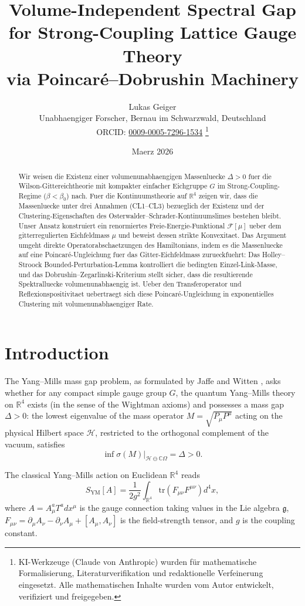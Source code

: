 \documentclass[12pt,a4paper]{article}
\title{\textbf{Volume-Independent Spectral Gap for Strong-Coupling Lattice Gauge Theory\\ via Poincar\'e--Dobrushin Machinery}}
\author{Lukas Geiger\\
\small Unabhaengiger Forscher, Bernau im Schwarzwald, Deutschland\\
\small ORCID: \href{https://orcid.org/0009-0005-7296-1534}{0009-0005-7296-1534}%
\thanks{KI-Werkzeuge (Claude von Anthropic) wurden für mathematische Formalisierung, Literaturverifikation und redaktionelle Verfeinerung eingesetzt. Alle mathematischen Inhalte wurden vom Autor entwickelt, verifiziert und freigegeben.}}
\date{Maerz 2026}
\theoremstyle{definition}
\theoremstyle{plain}
\theoremstyle{remark}
\begin{document}
\maketitle

\begin{abstract}
Wir weisen die Existenz einer volumenunabhaengigen Massenluecke $\Delta > 0$ fuer die Wilson-Gittereichtheorie mit kompakter einfacher Eichgruppe $G$ im Strong-Coupling-Regime ($\beta < \beta_0$) nach. Fuer die Kontinuumstheorie auf $\mathbb{R}^4$ zeigen wir, dass die Massenluecke unter drei Annahmen (CL1--CL3) bezueglich der Existenz und der Clustering-Eigenschaften des Osterwalder--Schrader-Kontinuumslimes bestehen bleibt. Unser Ansatz konstruiert ein renormiertes Freie-Energie-Funktional $\mathcal{F}[\mu]$ ueber dem gitterregulierten Eichfeldmass $\mu$ und beweist dessen strikte Konvexitaet. Das Argument umgeht direkte Operatorabschaetzungen des Hamiltonians, indem es die Massenluecke auf eine Poincar\'e-Ungleichung fuer das Gitter-Eichfeldmass zurueckfuehrt: Das Holley--Stroock Bounded-Perturbation-Lemma kontrolliert die bedingten Einzel-Link-Masse, und das Dobrushin--Zegarlinski-Kriterium stellt sicher, dass die resultierende Spektralluecke volumenunabhaengig ist. Ueber den Transferoperator und Reflexionspositivitaet uebertraegt sich diese Poincar\'e-Ungleichung in exponentielles Clustering mit volumenunabhaengiger Rate.
\end{abstract}

\section{Introduction}

The Yang--Mills mass gap problem, as formulated by Jaffe and Witten \cite{JaffeWitten2000}, asks whether for any compact simple gauge group $G$, the quantum Yang--Mills theory on $\mathbb{R}^4$ exists (in the sense of the Wightman axioms) and possesses a mass gap $\Delta > 0$: the lowest eigenvalue of the mass operator $M = \sqrt{P_\mu P^\mu}$ acting on the physical Hilbert space $\mathcal{H}$, restricted to the orthogonal complement of the vacuum, satisfies
\begin{equation}
    \inf \sigma(M)\big|_{\mathcal{H} \ominus \mathbb{C}\Omega} = \Delta > 0.
\end{equation}

The classical Yang--Mills action on Euclidean $\mathbb{R}^4$ reads
\begin{equation}\label{eq:YM-action}
    S_{\mathrm{YM}}[A] = \frac{1}{2g^2} \int_{\mathbb{R}^4} \mathrm{tr}\left( F_{\mu\nu} F^{\mu\nu} \right) d^4x,
\end{equation}
where $A = A_\mu^a T^a dx^\mu$ is the gauge connection taking values in the Lie algebra $\mathfrak{g}$, $F_{\mu\nu} = \partial_\mu A_\nu - \partial_\nu A_\mu + [A_\mu, A_\nu]$ is the field-strength tensor, and $g$ is the coupling constant.
\end{document}
